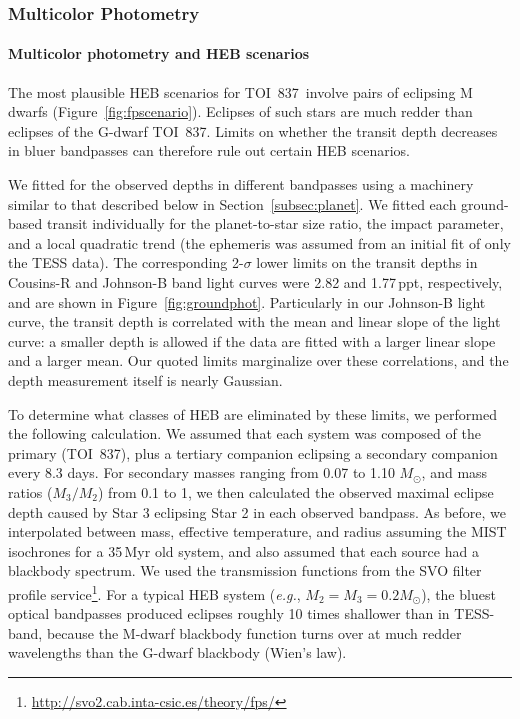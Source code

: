 \documentclass[12pt,twocolumn,tighten]{aastex63}
\newcommand{\tn}{TOI~837} %
\begin{document}
\subsubsection{Multicolor Photometry}
\label{subsec:colorphot}

\paragraph{Multicolor photometry and HEB scenarios}
The most plausible HEB scenarios for \tn\ involve pairs of eclipsing M
dwarfs (Figure~\ref{fig:fpscenario}).  Eclipses of such stars are much
redder than eclipses of the G-dwarf \tn.  Limits on whether the
transit depth decreases in bluer bandpasses can therefore rule out
certain HEB scenarios.

We fitted for the observed depths in different bandpasses using a
machinery similar to that described below in
Section~\ref{subsec:planet}.  We fitted each ground-based transit
individually for the planet-to-star size ratio, the impact parameter,
and a local quadratic trend (the ephemeris was assumed from an initial
fit of only the TESS data).  The corresponding 2-$\sigma$ lower limits
on the transit depths in Cousins-R and Johnson-B band light curves
were 2.82 and 1.77$\,$ppt, respectively, and are shown in
Figure~\ref{fig:groundphot}.  Particularly in our Johnson-B light
curve, the transit depth is correlated with the mean and linear slope
of the light curve: a smaller depth is allowed if the data are fitted
with a larger linear slope and a larger mean.  Our quoted limits
marginalize over these correlations, and the depth measurement itself
is nearly Gaussian.

To determine what classes of HEB are eliminated by these limits, we
performed the following calculation.  We assumed that each system was
composed of the primary (\tn), plus a tertiary companion eclipsing a
secondary companion every 8.3 days.  For secondary masses ranging from
0.07 to 1.10 $M_\odot$, and mass ratios ($M_3/M_2$) from 0.1 to 1, we
then calculated the observed maximal eclipse depth caused by Star 3
eclipsing Star 2 in each observed bandpass.  As before, we
interpolated between mass, effective temperature, and radius assuming
the MIST isochrones for a 35$\,$Myr old system, and also assumed that
each source had a blackbody spectrum.  We used the transmission
functions from the SVO filter profile
service\footnote{\url{http://svo2.cab.inta-csic.es/theory/fps/}}.  For
a typical HEB system ({\it e.g.}, $M_2=M_3=0.2M_\odot$), the bluest
optical bandpasses produced eclipses roughly 10 times shallower than
in TESS-band, because the M-dwarf blackbody function turns over at
much redder wavelengths than the G-dwarf blackbody (Wien's law).
\end{document}
